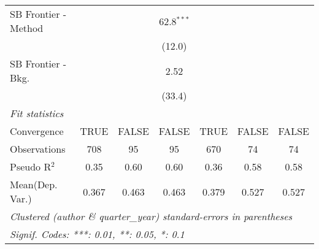 \begin{tabular}{lcccccc}
   SB Frontier - Method         &               &        & 62.8$^{***}$  &               &               &   \\   
                                &               &        & (12.0)        &               &               &   \\   
   SB Frontier - Bkg.           &               &        & 2.52          &               &               &   \\   
                                &               &        & (33.4)        &               &               &   \\   
   \midrule
   \emph{Fit statistics}\\
   Convergence                  &TRUE           & FALSE  & FALSE         & TRUE          & FALSE         & FALSE\\  
   Observations                 & 708           & 95     & 95            & 670           & 74            & 74\\  
   Pseudo R$^2$                 & 0.35          & 0.60   & 0.60          & 0.36          & 0.58          & 0.58\\  
Mean(Dep. Var.) & 0.367 & 0.463 & 0.463 & 0.379 & 0.527 & 0.527 \\
   \midrule \midrule
   \multicolumn{7}{l}{\emph{Clustered (author \& quarter\_year) standard-errors in parentheses}}\\
   \multicolumn{7}{l}{\emph{Signif. Codes: ***: 0.01, **: 0.05, *: 0.1}}\\
\end{tabular}
\par\endgroup
